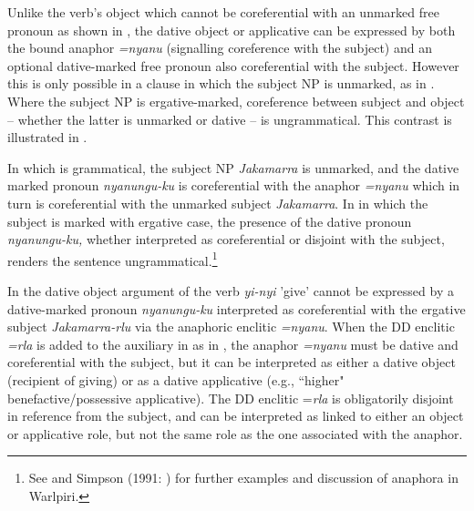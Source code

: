 \documentclass[output=paper]{../langscibook}
\begin{document}
Unlike the verb's object which cannot be coreferential with an unmarked free pronoun as shown in , the dative object or applicative can be expressed by both the bound anaphor \textit{=nyanu} (signalling coreference with the subject) and an optional dative-marked free pronoun also coreferential with the subject. However this is only possible in a clause in which the subject NP is unmarked, as in . Where the subject NP is ergative-marked, coreference between subject and object – whether the latter is unmarked or dative – is ungrammatical. This contrast is illustrated in .

In  which is grammatical, the subject NP \textit{Jakamarra} is unmarked, and the dative marked pronoun \textit{nyanungu-ku} is coreferential with the anaphor \textit{=nyanu} which in turn is coreferential with the unmarked subject \textit{Jakamarra}. In  in which the subject is marked with ergative case, the presence of the dative pronoun \textit{nyanungu-ku,} whether interpreted as coreferential or disjoint with the subject, renders the sentence ungrammatical.\footnote{See \citet[1440-1441]{HaleEtAl1995} and Simpson (1991: ) for further examples and discussion of anaphora in Warlpiri.}

In  the dative object argument of the verb \textit{yi-nyi} {} 'give' cannot be expressed by a dative-marked pronoun \textit{nyanungu-ku} interpreted as coreferential with the ergative subject \textit{Jakamarra-rlu} via the anaphoric enclitic \textit{=nyanu}. When the DD enclitic \textit{=rla} is added to the auxiliary in as in , the anaphor \textit{=nyanu} must be dative and coreferential with the subject, but it can be interpreted as either a dative object (recipient of giving) or as a dative applicative (e.g., ``higher" benefactive/possessive applicative). The DD enclitic =\textit{rla} is obligatorily disjoint in reference from the subject, and can be interpreted as linked to either an object or applicative role, but not the same role as the one associated with the anaphor.

\ea%
    \label{ex:laughren:12}

\end{document}
